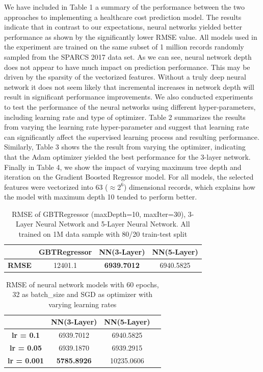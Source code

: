 \documentclass[10pt,twocolumn,letterpaper]{article}
\begin{document}
We have included in Table 1 a summary of the performance between the two approaches to implementing a healthcare cost prediction model. The results indicate that in contrast to our expectations, neural networks yielded better performance as shown by the significantly lower RMSE value. All models used in the experiment are trained on the same subset of 1 million records randomly sampled from the SPARCS 2017 data set. As we can see, neural network depth does not appear to have much impact on prediction performance. This may be driven by the sparsity of the vectorized features. Without a truly deep neural network it does not seem likely that incremental increases in network depth will result in significant performance improvements. We also conducted experiments to test the performance of the neural networks using different hyper-parameters, including learning rate and type of optimizer. Table 2 summarizes the results from varying the learning rate hyper-parameter and suggest that learning rate can significantly affect the supervised learning process and resulting performance. Similarly, Table 3 shows the the result from varying the optimizer, indicating that the Adam optimizer yielded the best performance for the 3-layer network. Finally in Table 4, we show the impact of varying maximum tree depth and iteration on the Gradient Boosted Regressor model. For all models, the selected features were vectorized into 63 ($\approx 2^6$) dimensional records, which explains how the model with maximum depth 10 tended to perform better.


\begin{table}[t!]
\small
\begin{center}
\begin{tabular}{|c|c|c|c|}
\hline
     & \textbf{GBTRegressor} & \textbf{NN(3-Layer)} & \textbf{NN(5-Layer)}\\ \hline
\textbf{RMSE} & 12401.1     & \textbf{6939.7012}  &  6940.5825                     \\ \hline
\end{tabular}
\end{center}
\caption{ RMSE of GBTRegressor (maxDepth=10, maxIter=30), 3-Layer Neural Network and 5-Layer Neural Network. All trained on 1M data sample with 80/20 train-test split}
\end{table}

\begin{table}[t!]
\small
\begin{center}
\begin{tabular}{|c|c|c|c|}
\hline
     & \textbf{NN(3-Layer)} & \textbf{NN(5-Layer)} \\ \hline
\textbf{lr = 0.1} & 6939.7012 & 6940.5825     \\ \hline
\textbf{lr = 0.05} & 6939.1870 & 6939.2915     \\ \hline
\textbf{lr = 0.001} & \textbf{5785.8926} & 10235.0606     \\ \hline
\end{tabular}
\end{center}
\caption{RMSE of neural network models with 60 epochs, 32 as batch\_size and SGD as optimizer with varying learning rates}
\end{table}
\end{document}
